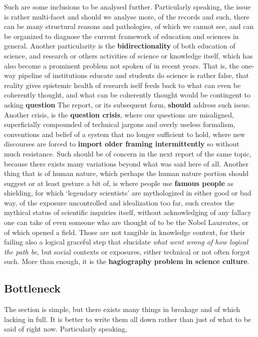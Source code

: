 \documentclass[10pt,a4paper]{article}
\begin{document}
Such are some inclusions to be analysed further. Particularly speaking, the issue is rather multi-facet and should we analyse more, of the records and such, there can be many structural reasons and pathologies, of which we cannot see, and can be organized to diagnose the current framework of education and sciences in general. Another particularity is the \textbf{bidirectionality} of both education of science, and research or others activities of science or knowledge itself, which has also become a prominent problem not spoken of in recent years. That is, the one-way pipeline of institutions educate and students do science is rather false, that reality gives epistemic health of research iself feeds back to what can even be coherently thought, and what can be coherently thought would be contingent to asking \textbf{question} The report, or its subsequent form, \textbf{should} address such issue. Another crisis, is the \textbf{question crisis}, where our questions are misaligned, superficially compounded of technical jargons and overly useless formalism, conventions and belief of a system that no longer sufficient to hold, where new discourses are forced to \textbf{import older framing intermittently} so without much resistance. Such should be of concern in the next report of the same topic, because there exists many variations beyond what was said here of all. Another thing that is of human nature, which perhaps the human nature portion should suggest or at least gesture a bit of, is where people use \textbf{famous people} as shielding, for which `legendary scientists' are mythologized in either good or bad way, of the exposure uncontrolled and idealization too far, such creates the mythical status of scientific inquiries itself, without acknowledging of any fallacy one can take of even someone who are thought of to be the Nobel Laureates, or of which opened a field. Those are not tangible in knowledge context, for their failing also a logical graceful step that elucidate \textit{what went wrong of how logical the path be}, but social contexts or exposures, either technical or not often forgot such. More than enough, it is the \textbf{hagiography problem in science culture}. 

\subsection{Bottleneck}

The section is simple, but there exists many things in breakage and of which lacking in full. It is better to write them all down rather than just of what to be said of right now. Particularly speaking, 
\end{document}
